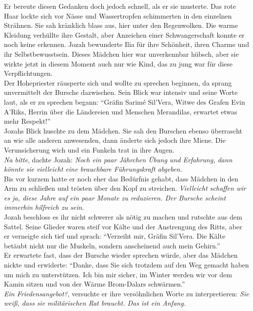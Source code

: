 Er bereute diesen Gedanken doch jedoch schnell, als er sie musterte. Das rote Haar lockte sich 
vor Nässe und Wassertropfen schimmerten in den einzelnen Strähnen. Sie sah kränklich blass aus, 
hier unter den Regenwolken. Die warme Kleidung verhüllte ihre Gestalt, aber Anzeichen einer 
Schwangerschaft konnte er noch keine erkennen. Jozah bewunderte Ilia für ihre Schönheit, ihren 
Charme und ihr Selbstbewusstsein. Dieses Mädchen hier war unverkennbar hübsch, aber sie wirkte 
jetzt 
in diesem Moment auch nur wie Kind, das zu jung war für diese Verpflichtungen.\\
Der Hohepriester räusperte sich und wollte zu sprechen beginnen, da sprang unvermittelt der Bursche 
dazwischen. Sein Blick war intensiv und seine Worte laut, als er zu sprechen begann: ``Gräfin 
Sarimé Sil'Vera, Witwe des Grafen Evin A'Riks, Herrin über die Ländereien und Menschen Merandilas, 
erwartet etwas mehr Respekt!''\\
Jozahs Blick huschte zu dem Mädchen. Sie sah den Burschen ebenso überrascht an wie alle anderen 
anwesenden, dann änderte sich jedoch ihre Miene. Die Verunsicherung wich und ein Funkeln trat in 
ihre Augen.\\
\textit{Na bitte}, dachte Jozah: \textit{Noch ein paar Jährchen Übung und Erfahrung, dann könnte 
sie vielleicht eine brauchbare Führungskraft abgeben.}\\
Bis vor kurzem hatte er noch eher das Bedürfnis gehabt, dass Mädchen in den Arm zu schließen und 
trösten über den Kopf zu streichen. \textit{Vielleicht schaffen wir es ja, diese Jahre auf ein paar 
Monate zu reduzieren. Der Bursche scheint immerhin hilfreich zu sein.}\\
Jozah beschloss es ihr nicht schwerer als nötig zu machen und rutschte aus dem Sattel. Seine 
Glieder waren steif vor Kälte und der Anstrengung des Ritts, aber er verneigte sich tief und 
sprach: ``Verzeiht mir, Gräfin Sil'Vera. Die Kälte betäubt nicht nur die Muskeln, sondern 
anscheinend auch mein Gehirn.''\\
Er erwartete fast, dass der Bursche wieder sprechen würde, aber das Mädchen nickte und erwiderte: 
``Danke, dass Sie sich trotzdem auf den Weg gemacht haben um mich zu unterstützen. Ich bin mir 
sicher, im Winter werden wir vor dem Kamin sitzen und von der Wärme Brom-Dalars schwärmen.''\\
\textit{Ein Friedensangebot?}, versuchte er ihre versöhnlichen Worte zu interpretieren: \textit{Sie 
weiß, dass sie militärischen Rat braucht. Das ist ein Anfang.}\\
